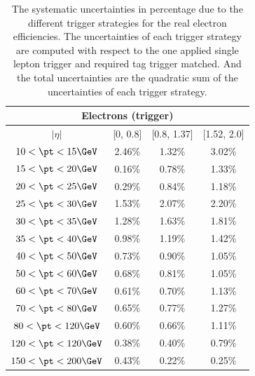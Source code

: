 \begin{table}[htbp]
\begin{center}
\begin{tabular}{cccc}
\hline
\hline
\multicolumn{4}{c}{Electrons (trigger)}\\
\hline
$|\eta|$ & [0, 0.8] & [0.8, 1.37] & [1.52, 2.0]\\
\hline
$10<\pt<15 \GeV$ & 2.46\% & 1.32\% & 3.02\%\\
$15<\pt<20 \GeV$ & 0.16\% & 0.78\% & 1.33\%\\
$20<\pt<25 \GeV$ & 0.29\% & 0.84\% & 1.18\%\\
$25<\pt<30 \GeV$ & 1.53\% & 2.07\% & 2.20\%\\
$30<\pt<35 \GeV$ & 1.28\% & 1.63\% & 1.81\%\\
$35<\pt<40 \GeV$ & 0.98\% & 1.19\% & 1.42\%\\
$40<\pt<50 \GeV$ & 0.73\% & 0.90\% & 1.05\%\\
$50<\pt<60 \GeV$ & 0.68\% & 0.81\% & 1.05\%\\
$60<\pt<70 \GeV$ & 0.61\% & 0.70\% & 1.13\%\\
$70<\pt<80 \GeV$ & 0.65\% & 0.77\% & 1.27\%\\
$80<\pt<120 \GeV$ & 0.60\% & 0.66\% & 1.11\%\\
$120<\pt<120 \GeV$ & 0.38\% & 0.40\% & 0.79\%\\
$150<\pt<200 \GeV$ & 0.43\% & 0.22\% & 0.25\%\\
\hline
\hline
\end{tabular}
\caption{The systematic uncertainties in percentage due to the different trigger strategies for the real electron efficiencies.
The uncertainties of each trigger strategy are computed with respect to the one applied single lepton trigger and required tag trigger matched.
And the total uncertainties are the quadratic sum of the uncertainties of each trigger strategy.
}
\label{tab:RLE_trigger_syst_elec}
\end{center}
\end{table}

